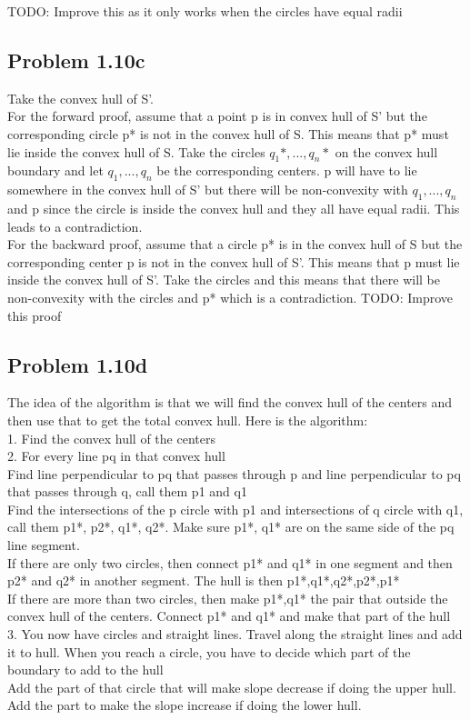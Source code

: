 \documentclass[11pt,psfig]{article}
\begin{document}
TODO: Improve this as it only works when the circles have equal radii

\subsection*{Problem 1.10c}

Take the convex hull of S'. \\
For the forward proof, assume that a point p is in convex hull of S' but the corresponding circle p* is not in the convex hull of S. This means that p* must lie inside the convex hull of S. Take the circles $q_1*,...,q_n*$ on the convex hull boundary and let $q_1,...,q_n$ be the corresponding centers. p will have to lie somewhere in the convex hull of S' but there will be non-convexity with $q_1,...,q_n$ and p since the circle is inside the convex hull and they all have equal radii. This leads to a contradiction. \\
For the backward proof, assume that a circle p* is in the convex hull of S but the corresponding center p is not in the convex hull of S'. This means that p must lie inside the convex hull of S'. Take the circles and this means that there will be non-convexity with the circles and p* which is a contradiction.
TODO: Improve this proof

\subsection*{Problem 1.10d}

The idea of the algorithm is that we will find the convex hull of the centers and then use that to get the total convex hull. Here is the algorithm:\\
1. Find the convex hull of the centers\\
2. For every line pq in that convex hull\\
			Find line perpendicular to pq that passes through p and line perpendicular to pq that passes through q, call them p1 and q1\\
			Find the intersections of the p circle with p1 and intersections of q circle with q1, call them p1*, p2*, q1*, q2*. Make sure p1*, q1* are on the same side of the pq line segment. \\
			If there are only two circles, then connect p1* and q1* in one segment and then p2* and q2* in another segment. The hull is then p1*,q1*,q2*,p2*,p1*\\
			If there are more than two circles, then make p1*,q1* the pair that outside the convex hull of the centers. Connect p1* and q1* and make that part of the hull\\
3. You now have circles and straight lines. Travel along the straight lines and add it to hull. When you reach a circle, you have to decide which part of the boundary to add to the hull\\
			Add the part of that circle that will make slope decrease if doing the upper hull.\\
			Add the part to make the slope increase if doing the lower hull.
\end{document}
